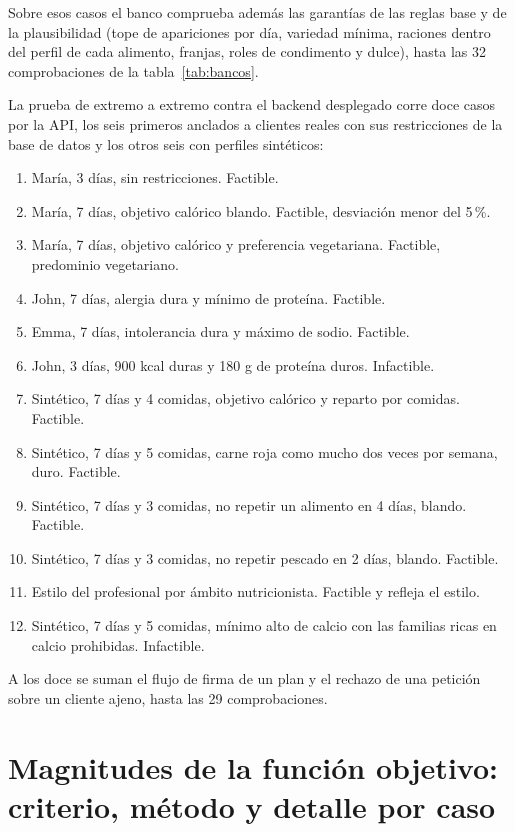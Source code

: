 Sobre esos casos el banco comprueba además las garantías de las reglas base y de la plausibilidad (tope de apariciones por día, variedad mínima, raciones dentro del perfil de cada alimento, franjas, roles de condimento y dulce), hasta las 32 comprobaciones de la tabla~\ref{tab:bancos}.

La prueba de extremo a extremo contra el backend desplegado corre doce casos por la API, los seis primeros anclados a clientes reales con sus restricciones de la base de datos y los otros seis con perfiles sintéticos:

\begin{enumerate}
\item María, 3 días, sin restricciones. Factible.
\item María, 7 días, objetivo calórico blando. Factible, desviación menor del 5\,\%.
\item María, 7 días, objetivo calórico y preferencia vegetariana. Factible, predominio vegetariano.
\item John, 7 días, alergia dura y mínimo de proteína. Factible.
\item Emma, 7 días, intolerancia dura y máximo de sodio. Factible.
\item John, 3 días, 900 kcal duras y 180 g de proteína duros. Infactible.
\item Sintético, 7 días y 4 comidas, objetivo calórico y reparto por comidas. Factible.
\item Sintético, 7 días y 5 comidas, carne roja como mucho dos veces por semana, duro. Factible.
\item Sintético, 7 días y 3 comidas, no repetir un alimento en 4 días, blando. Factible.
\item Sintético, 7 días y 3 comidas, no repetir pescado en 2 días, blando. Factible.
\item Estilo del profesional por ámbito nutricionista. Factible y refleja el estilo.
\item Sintético, 7 días y 5 comidas, mínimo alto de calcio con las familias ricas en calcio prohibidas. Infactible.
\end{enumerate}

A los doce se suman el flujo de firma de un plan y el rechazo de una petición sobre un cliente ajeno, hasta las 29 comprobaciones.

\section{Magnitudes de la función objetivo: criterio, método y detalle por caso}
\label{sec:anexoMagnitudes}

